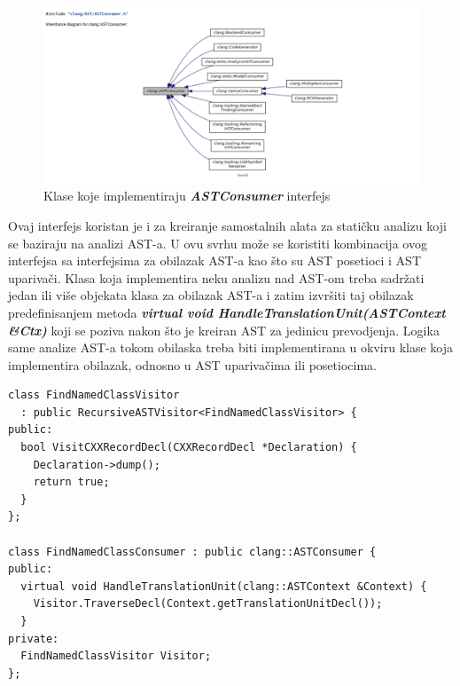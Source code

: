 \documentclass[12pt,oneside]{memoir}
\begin{document}
\begin{figure}[!h]
\begin{center}
\includegraphics[scale=0.3]{ASTConsumer2.png}
\end{center}
\caption{Klase koje implementiraju \textit{\textbf{ASTConsumer}} interfejs}
\label{fig:exploded}
\end{figure}

Ovaj interfejs koristan je i za kreiranje samostalnih alata za stati\v{c}ku analizu koji se baziraju na analizi AST-a. U ovu svrhu mo\v{z}e se koristiti kombinacija
ovog interfejsa sa interfejsima za obilazak AST-a kao \v{s}to su AST posetioci i AST upariva\v{c}i. Klasa koja implementira neku analizu nad AST-om treba sadr\v{z}ati jedan ili vi\v{s}e objekata klasa za obilazak AST-a i zatim izvr\v{s}iti taj obilazak predefinisanjem metoda \textit{\textbf{virtual void  HandleTranslationUnit(ASTContext \&Ctx)}} koji se poziva nakon \v{s}to je kreiran AST za jedinicu prevodjenja. Logika same analize AST-a tokom obilaska treba biti implementirana u okviru klase koja implementira obilazak, odnosno u AST upariva\v{c}ima ili posetiocima.

\begin{lstlisting}[caption={Primer upotrebe klase \textit{\textbf{ASTConsumer}} u svrhu stati\v{c}ke analize}, label=simple]
class FindNamedClassVisitor
  : public RecursiveASTVisitor<FindNamedClassVisitor> {
public:
  bool VisitCXXRecordDecl(CXXRecordDecl *Declaration) {
    Declaration->dump();
    return true;
  }
};

class FindNamedClassConsumer : public clang::ASTConsumer {
public:
  virtual void HandleTranslationUnit(clang::ASTContext &Context) {
    Visitor.TraverseDecl(Context.getTranslationUnitDecl());
  }
private:
  FindNamedClassVisitor Visitor;
};
\end{lstlisting}

\end{document}
